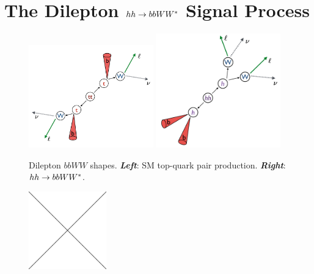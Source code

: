 \section{The Dilepton $hh \rightarrow bbWW^*$ Signal Process}
\label{sec:hh_pheno}

\begin{figure}[!htb]
    \begin{center}
        \includegraphics[width=0.48\textwidth]{figures/search_hh/signal_pheno/ttbar_topo}
        \includegraphics[width=0.48\textwidth]{figures/search_hh/signal_pheno/hh_topo}
        \caption{
            Dilepton $bbWW$ shapes.
            \textit{\textbf{Left}}: SM top-quark pair production.
            \textit{\textbf{Right}}: $hh \rightarrow bbWW^*$.
        }
        \label{fig:hh_topo}
    \end{center}
\end{figure}

\begin{figure}[!htb]
    \begin{center}
        \includegraphics[width=0.3\textwidth]{figures/placeholder}
        \caption{
        }
        \label{fig:xxx}
    \end{center}
\end{figure}
